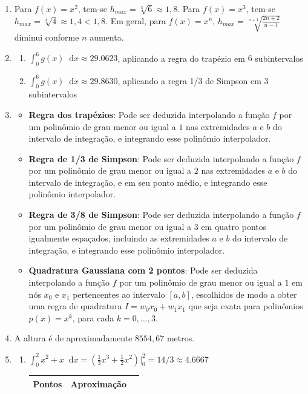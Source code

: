 \documentclass[12pt,a4paper]{article}
\newcommand*\diff{\mathop{}\!\mathrm{d}}
\begin{document}
\begin{enumerate}
\item Para $f(x) = x^2$, tem-se $h_{max}=\sqrt[3]{6} \approx 1,8$. Para $f(x) = x^3$, tem-se $h_{max}=\sqrt[4]{4}\approx 1,4 < 1,8$. Em geral, para $f(x) = x^n$, $h_{max}=\sqrt[n+1]{\frac{2n+2}{n-1}}$ diminui conforme $n$ aumenta.
\item
\begin{enumerate}
\item $\int_0^6 g(x)\diff{x} \approx 29.0623$, aplicando a regra do trapézio em $6$ subintervalos
\item $\int_0^6 g(x)\diff{x} \approx 29.8630$, aplicando a regra 1/3 de Simpson em $3$ subintervalos
\end{enumerate}
\item \begin{itemize}
\item \textbf{Regra dos trapézios}: Pode ser deduzida interpolando a função $f$ por um polinômio de grau menor ou igual a $1$ nas extremidades $a$ e $b$ do intervalo de integração, e integrando esse polinômio interpolador.
\item \textbf{Regra de 1/3 de Simpson}: Pode ser deduzida interpolando a função $f$ por um polinômio de grau menor ou igual a $2$ nas extremidades $a$ e $b$ do intervalo de integração, e em seu ponto médio, e integrando esse polinômio interpolador.
\item \textbf{Regra de 3/8 de Simpson}: Pode ser deduzida interpolando a função $f$ por um polinômio de grau menor ou igual a $3$ em quatro pontos igualmente espaçados, incluindo as extremidades $a$ e $b$ do intervalo de integração, e integrando esse polinômio interpolador.
\item \textbf{Quadratura Gaussiana com 2 pontos}: Pode ser deduzida interpolando a função $f$ por um polinômio de grau menor ou igual a $1$ em nós $x_0$ e $x_1$ pertencentes ao intervalo $[a, b]$, escolhidos de modo a obter uma regra de quadratura $I = w_0x_0 + w_1 x_1$ que seja exata para polinômios $p(x) = x^k$, para cada $k=0,\ldots, 3$.
\end{itemize}
\item A altura é de aproximadamente $8554,67$ metros.
\item
\begin{enumerate}
\item $\int_0^2 x^2 + x\diff{x} = \left( \frac{1}{3}x^3 +\frac{1}{2}x^2 \right)\Big|_0^2 = 14/3 \approx 4.6667$
\begin{center}
\begin{tabular}{crr}
\hline
Pontos & Aproximação \\ \hline

\end{tabular}
\end{center}
\end{enumerate}
\end{enumerate}
\end{document}

